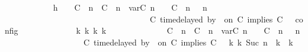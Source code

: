 \begin{isabellebody}
\ \ \ \ \ \ \ \ \ \ \isamarkupfalse%
\ h{}{\isacharcolon}\ {\isacartoucheopen}{\isasymrho}\ {\isasymin}\ {\isasymlbrakk}\ {\isacharparenleft}{\isacharparenleft}C\ {\isasymUp}\ n{\isacharparenright}\ {\isacharhash}\ {\isacharparenleft}C\ {\isasymDown}\ n\ {\isacharat}{\isasymsharp}\ {\isasymlparr}{\isasymtau}\isactrlsub v\isactrlsub a\isactrlsub r{\isacharparenleft}C\ n{\isacharparenright}\ {\isasymoplus}\ {\isasymdelta}{\isasymtau}{\isasymrparr}{\isacharparenright}\ {\isacharhash}\ {\isacharparenleft}C\ {\isasymUp}\ n{\isacharparenright}\ {\isacharhash}\ {\isasymGamma}{\isacharparenright}{\isacharcomma}\ n\isanewline
\ \ \ \ \ \ \ \ \ \ \ \ \ \ \ \ \ \ \ \ \ \ \ \ \ \ \ \ \ \ \ \ {\isasymturnstile}\ {\isasymPsi}\ {\isasymtriangleright}\ {\isacharparenleft}{\isacharparenleft}C\ time{\isacharminus}delayed{\isasymbowtie}\ by\ {\isasymdelta}{\isasymtau}\ on\ C\ implies\ C\ {\isacharhash}\ {\isasymPhi}{\isacharparenright}\ {\isasymrbrakk}\isactrlsub c\isactrlsub o\isactrlsub n\isactrlsub f\isactrlsub i\isactrlsub g{\isacartoucheclose}\isanewline
\ \ \ \ \ \ \ \ \ \ \isamarkupfalse%
\ \isamarkupfalse%
\ {\isacartoucheopen}{\isasymexists}{\isasymGamma}\isactrlsub k\ {\isasymPsi}\isactrlsub k\ {\isasymPhi}\isactrlsub k\ k{\isachardot}\isanewline
\ \ \ \ \ \ \ \ \ \ \ \ \ \ {\isacharparenleft}{\isacharparenleft}{\isacharparenleft}{\isacharparenleft}C\ {\isasymUp}\ n{\isacharparenright}\ {\isacharhash}\ {\isacharparenleft}C\ {\isasymDown}\ n\ {\isacharat}{\isasymsharp}\ {\isasymlparr}{\isasymtau}\isactrlsub v\isactrlsub a\isactrlsub r{\isacharparenleft}C\ n{\isacharparenright}\ {\isasymoplus}\ {\isasymdelta}{\isasymtau}{\isasymrparr}{\isacharparenright}\ {\isacharhash}\ {\isacharparenleft}C\ {\isasymUp}\ n{\isacharparenright}\ {\isacharhash}\ {\isasymGamma}{\isacharparenright}{\isacharcomma}\ n\isanewline
\ \ \ \ \ \ \ \ \ \ \ \ \ \ \ \ {\isasymturnstile}\ {\isasymPsi}\ {\isasymtriangleright}\ {\isacharparenleft}{\isacharparenleft}C\ time{\isacharminus}delayed{\isasymbowtie}\ by\ {\isasymdelta}{\isasymtau}\ on\ C\ implies\ C\ {\isacharhash}\ {\isasymPhi}{\isacharparenright}{\isacharparenright}\ {\isasymhookrightarrow}\isactrlbsup k\isactrlesup \ {\isacharparenleft}{\isasymGamma}\isactrlsub k{\isacharcomma}\ Suc\ n\ {\isasymturnstile}\ {\isasymPsi}\isactrlsub k\ {\isasymtriangleright}\ {\isasymPhi}\isactrlsub k{\isacharparenright}{\isacharparenright}\isanewline

\end{isabellebody}
